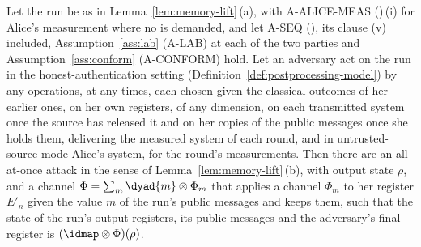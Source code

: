 \begin{lemma}\label{lem:honest-attacks}
Let the run be as in Lemma~\ref{lem:memory-lift}\,(a), with A-ALICE-MEAS
()\,(i) for Alice's measurement where
no  is demanded, and let A-SEQ
(), its clause (v) included,
Assumption~\ref{ass:lab} (A-LAB) at each of the two parties and
Assumption~\ref{ass:conform} (A-CONFORM) hold. Let an adversary act on the run in the honest-authentication setting
(Definition~\ref{def:postprocessing-model}) by any operations, at any times,
each chosen given the classical outcomes of her earlier ones, on her own
registers, of any dimension, on each transmitted system once the source has
released it and on her copies of the public messages once she holds them,
delivering the measured system of each round, and in untrusted-source mode
Alice's system, for the round's measurements. Then there are an all-at-once
attack in the sense of Lemma~\ref{lem:memory-lift}\,(b), with output state
$\rho$, and a channel $\Phi=\sum_m\dyad{m}\otimes\Phi_m$ that applies a
channel $\Phi_m$ to her register $E'_n$ given the value $m$ of the run's
public messages and keeps them, such that the state of the run's output
registers, its public messages and the adversary's final register is
$(\idmap\otimes\Phi)(\rho)$.
\end{lemma}

